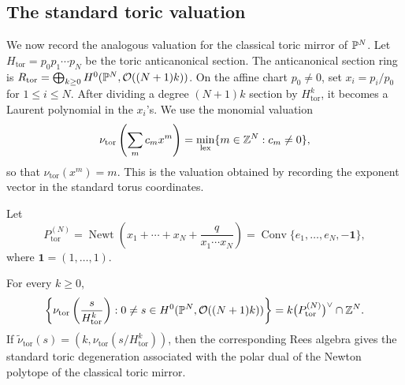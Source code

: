 \subsection{The standard toric valuation}
We now record the analogous valuation for the classical toric mirror of \(\mathbb{P}^N\). Let \(H_{\mathrm{tor}}=p_0p_1\cdots p_N\) be the toric anticanonical section. The anticanonical section ring is \(R_{\mathrm{tor}}=\bigoplus_{k\ge0}H^0(\mathbb{P}^N,\mathcal O((N+1)k))\). On the affine chart \(p_0\ne0\), set \(x_i=p_i/p_0\) for \(1\le i\le N\).
After dividing a degree \((N+1)k\) section by \(H_{\mathrm{tor}}^k\), it becomes a Laurent polynomial in the \(x_i\)'s. We use the monomial valuation
\[
\nu_{\mathrm{tor}}\left(\sum_m c_mx^m\right)
=
\min_{\mathrm{lex}}\{m\in\mathbb{Z}^N:c_m\ne0\},
\]
so that \(\nu_{\mathrm{tor}}(x^m)=m\). This is the valuation obtained by recording the exponent vector in the standard torus coordinates.

Let
\[
P_{\mathrm{tor}}^{(N)}
=
\operatorname{Newt}\left(x_1+\cdots+x_N+\frac{q}{x_1\cdots x_N}\right)
=
\operatorname{Conv}\{e_1,\ldots,e_N,-\mathbf 1\},
\]
where \(\mathbf 1=(1,\ldots,1)\).

\begin{thm}\label{thm:standard-toric-valuation}
For every \(k\ge0\),
\[
\left\{
\nu_{\mathrm{tor}}\left(\frac{s}{H_{\mathrm{tor}}^k}\right):
0\ne s\in H^0(\mathbb{P}^N,\mathcal O((N+1)k))
\right\}
=
k\bigl(P_{\mathrm{tor}}^{(N)}\bigr)^\vee\cap\mathbb{Z}^N.
\]
If \(\widetilde\nu_{\mathrm{tor}}(s)=(k,\nu_{\mathrm{tor}}(s/H_{\mathrm{tor}}^k))\), then the corresponding Rees algebra gives the standard toric degeneration associated with the polar dual of the Newton polytope of the classical toric mirror.
\end{thm}

